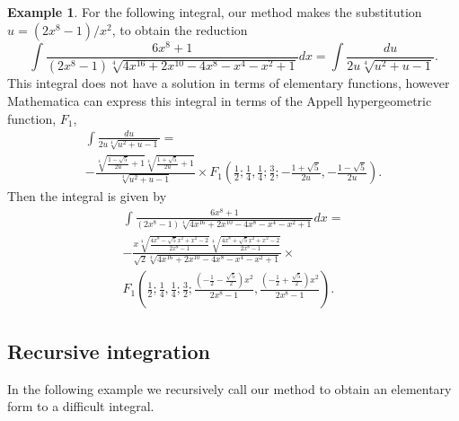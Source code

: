 \documentclass[12pt]{article}
\numberwithin{equation}{section}
\theoremstyle{definition}
\newtheorem{example}{Example}[section]
\begin{document}
\begin{example}
For the following integral, our method makes the substitution 
$u = \left(2 x^8 - 1\right)/x^2$, to obtain the reduction
\begin{equation*}
\int\frac{6 x^8+1}{\left(2 x^8-1\right) \sqrt[4]{4 x^{16}+2 x^{10}-4 x^8-x^4-x^2+1}}dx = 
\int\frac{du}{2 u \sqrt[4]{u^2+u-1}}.
\end{equation*}
This integral does not have a solution in terms of elementary functions, however Mathematica
can express this integral in terms of the Appell hypergeometric function, 
\href{https://reference.wolfram.com/language/ref/AppellF1.html}{$F_1$},
\begin{multline*}
\int\frac{du}{2 u \sqrt[4]{u^2+u-1}} = \\
-\frac{\sqrt[4]{\frac{1-\sqrt{5}}{2 u}+1} \sqrt[4]{\frac{1+\sqrt{5}}{2 u}+1}}{\sqrt[4]{u^2+u-1}} \times
F_1\left(\frac{1}{2};\frac{1}{4},\frac{1}{4};\frac{3}{2};-\frac{1+\sqrt{5}}{2u},-\frac{1-\sqrt{5}}{2 u}\right).
\end{multline*}
Then the integral is given by 
\begin{multline*}
\int\frac{6 x^8+1}{\left(2 x^8-1\right) \sqrt[4]{4 x^{16}+2 x^{10}-4 x^8-x^4-x^2+1}}dx = \\
-\frac{x \sqrt[4]{\frac{4 x^8-\sqrt{5} x^2+x^2-2}{2 x^8-1}} \sqrt[4]{\frac{4 x^8+\sqrt{5}x^2+x^2-2}{2 x^8-1}}}
{\sqrt{2} \sqrt[4]{4 x^{16}+2 x^{10}-4 x^8-x^4-x^2+1}} \times \\
F_1\left(\frac{1}{2};\frac{1}{4},\frac{1}{4};\frac{3}{2};\frac{\left(-\frac{1}{2}-\frac{\sqrt{5}}{2}\right) x^2}{2 x^8-1},\frac{\left(-\frac{1}{2}+\frac{\sqrt{5}}{2}\right) x^2}{2x^8-1}\right).
\end{multline*}
\end{example}

\subsection{Recursive integration}

In the following example we recursively call our method to obtain an elementary form 
to a difficult integral. 
\end{document}
